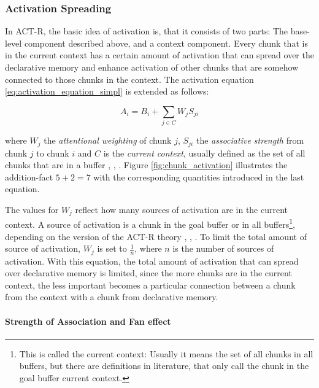 \subsubsection{Activation Spreading}

In ACT-R, the basic idea of activation is, that it consists of two parts: The base-level component described above, and a context component. Every chunk that is in the current context has a certain amount of activation that can spread over the declarative memory and enhance activation of other chunks that are somehow connected to those chunks in the context. The activation equation \eqref{eq:activation_equation_simpl} is extended as follows:

\begin{equation}
\label{eq:activation_equation}
 A_i = B_i + \sum_{j \in C}{W_j S_{ji}}
\end{equation}

where $W_j$ the \emph{attentional weighting} of chunk $j$, $S_{ji}$ the \emph{associative strength} from chunk $j$ to chunk $i$ and $C$ is the \emph{current context}, usually defined as the set of all chunks that are in a buffer \cite[p. 1042]{anderson_integrated_2004}, \cite[p. 33]{taatgen_modeling_2006}, \cite[unit 5]{actr_tutorial}. Figure \ref{fig:chunk_activation} illustrates the addition-fact $5 + 2 = 7$ with the corresponding quantities introduced in the last equation. 

The values for $W_j$ reflect how many sources of activation are in the current context. A source of activation is a chunk in the goal buffer or in all buffers\footnote{This is called the current context: Usually it means the set of all chunks in all buffers, but there are definitions in literature, that only call the chunk in the goal buffer current context.}, depending on the version of the ACT-R theory \cite[p. 1042]{anderson_integrated_2004}, \cite[p. 33]{taatgen_modeling_2006}, \cite[unit 5, p. 1]{actr_tutorial}. To limit the total amount of source of activation, $W_j$ is set to $\frac{1}{n}$, where $n$ is the number of sources of activation. With this equation, the total amount of activation that can spread over declarative memory is limited, since the more chunks are in the current context, the less important becomes a particular connection between a chunk from the context with a chunk from declarative memory.

\paragraph{Strength of Association and Fan effect}

